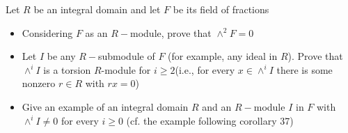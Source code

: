 \documentclass[11pt]{article}
\newenvironment{problem}[2][Problem\!]{\begin{tcolorbox}\begin{trivlist}
\item[\hskip \labelsep {\bfseries #1}\hskip \labelsep {\bfseries #2}]}{\end{trivlist}\end{tcolorbox}}
\renewcommand{\geq}{\geqslant}
\begin{document}
\begin{problem} {11.5.8}
    Let $R$ be an integral domain and let $F$ be its field of fractions
    \begin{itemize}
        \item[(a)] Considering $F$ as an $R-$module, prove that $\wedge^{2}F = 0$
        \item[(b)]  Let $I$ be any $R-$submodule of $F$ (for example, any ideal in $R$). Prove that $\wedge^{i}I$ is a torsion $R$-module for $i \geq 2$(i.e., for every $x \in \wedge^{i}I$ there is some nonzero $r\in R$ with $rx = 0$)
        \item[(c)] Give an example of an integral domain $R$ and an $R-$module $I$ in $F$ with $\wedge^{i}I \neq 0$ for every $i \geq 0$ (cf. the example following corollary 37)
    \end{itemize}
\end{problem}
\end{document}

